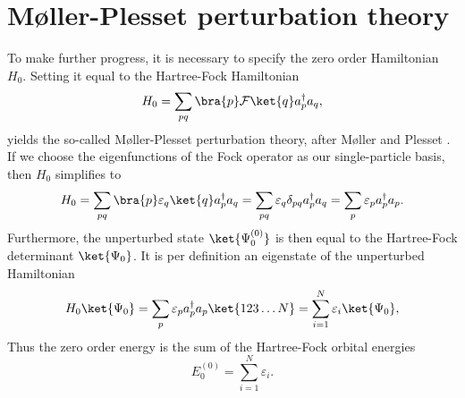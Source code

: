\section{Møller-Plesset perturbation theory}
To make further progress, it is necessary to specify the zero order Hamiltonian $H_0$. Setting it equal to the Hartree-Fock Hamiltonian
\begin{equation}
 H_0 = \sum_{pq}\bra{p}\mathcal{F}\ket{q}a^\dagger_p a_q,
\end{equation}
yields the so-called Møller-Plesset perturbation theory, after Møller and Plesset \cite{MP}.
If we choose the eigenfunctions of the Fock operator as our single-particle basis,
then $H_0$ simplifies to
\begin{equation}
 H_0 = \sum_{pq}\bra{p}\varepsilon_q\ket{q}a^\dagger_p a_q = \sum_{pq}\varepsilon_q\delta_{pq} a^\dagger_p a_q = \sum_p \varepsilon_p a^\dagger_p a_p.
\end{equation}
Furthermore, the unperturbed state $\ket{\Psi_0^{(0)}}$ is then equal to the Hartree-Fock
determinant $\ket{\Psi_0}$. It is per definition an eigenstate of the
unperturbed Hamiltonian
\begin{equation}
 H_0 \ket{\Psi_0} = \sum_p \varepsilon_p a^\dagger_p a_p \ket{123\dots N} = \sum_{i=1}^N \varepsilon_i \ket{\Psi_0},
\end{equation}
Thus the zero order energy is the sum of the Hartree-Fock orbital energies
\begin{equation}
\label{eq:pert_zero_order}
 E^{(0)}_0 = \sum_{i=1}^N \varepsilon_i.
\end{equation}

